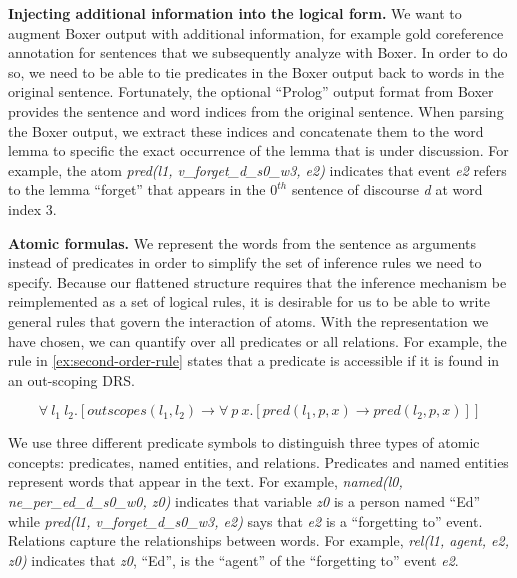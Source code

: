 \noindent\textbf{Injecting additional information into the logical form.}
We want to augment Boxer output with additional
information, for example gold coreference annotation for sentences
that we subsequently analyze with Boxer. In order to do so, we need to
be able to tie predicates in the Boxer output back to words in the
original sentence. Fortunately, the optional ``Prolog'' output format from Boxer
provides the sentence and word indices from the original sentence.  When
parsing the Boxer output, we extract these indices and concatenate them to the
word lemma to specific the exact occurrence of the lemma that is under
discussion.  For example, the atom {\it pred(l1, v\_forget\_d\_s0\_w3, e2)}
indicates that event {\it e2} refers to the lemma ``forget'' that appears in the
$0^{th}$ sentence of discourse {\it d} at word index 3.


\noindent\textbf{Atomic formulas.}
We represent the words from the sentence as arguments instead of
predicates in order to simplify the set of inference rules we need to
specify. Because our flattened structure requires that the inference
mechanism be reimplemented as a set of logical rules, it is desirable
for us to be able to write general rules that govern the interaction
of atoms. With the representation we have chosen, we can quantify over
all predicates or all relations. For example, the rule in
\eqref{ex:second-order-rule} states that a predicate is accessible if
it is found in an out-scoping DRS.

\begin{equation}\label{ex:second-order-rule}
\forall~l_1~l_2.[outscopes(l_1,l_2) \rightarrow \forall~p~x.[pred(l_1,p,x) \rightarrow pred(l_2,p,x)]]
\end{equation}
 
We use three different predicate symbols to distinguish three types of atomic concepts: predicates, named entities, and
relations.  Predicates and named entities represent words that appear in the
text.  For example, {\it named(l0, ne\_per\_ed\_d\_s0\_w0, z0)} indicates that
variable {\it z0} is a person named ``Ed'' while 
{\it pred(l1, v\_forget\_d\_s0\_w3, e2)} says that {\it e2} is a
``forgetting to'' event.  
Relations capture the relationships between words.  For example, 
{\it rel(l1, agent, e2, z0)} indicates that {\it z0}, ``Ed'', is the ``agent''
of the ``forgetting to'' event {\it e2}.



